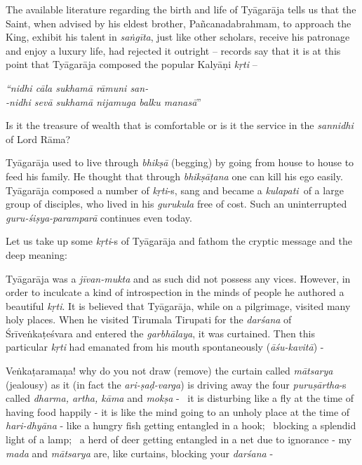 The available literature regarding the birth and life of Tyāgarāja tells us that the Saint, when advised by his eldest brother, Pañcanadabrahmam, to approach the King, exhibit his talent in \textit{saṅgīta}, just like other scholars, receive his patronage and enjoy a luxury life, had rejected it outright – records say that it is at this point that Tyāgarāja composed the popular Kalyāṇi \textit{kṛti} –

\begin{myquote}
\textit{“nidhi cāla sukhamā rāmuni san-}\\ \textit{-nidhi sevā sukhamā nijamuga balku manasā}”
\end{myquote}

Is it the treasure of wealth that is comfortable or is it the service in the \textit{sannidhi} of Lord Rāma?

Tyāgarāja used to live through \textit{bhikṣā} (begging) by going from house to house to feed his family. He thought that through \textit{bhikṣāṭana} one can kill his ego easily. Tyāgarāja composed a number of \textit{kṛti}-s, sang and became a \textit{kulapati} of a large group of disciples, who lived in his \textit{gurukula} free of cost. Such an uninterrupted \textit{guru-śiṣya-paramparā} continues even today. 

Let us take up some \textit{kṛti}-s of Tyāgarāja and fathom the cryptic message and the deep meaning: 

Tyāgarāja was a \textit{jīvan-mukta} and as such did not possess any vices. However, in order to inculcate a kind of introspection in the minds of people he authored a beautiful \textit{kṛti}. It is believed that Tyāgarāja, while on a pilgrimage, visited many holy places. When he visited Tirumala Tirupati for the \textit{darśana} of Śrīveṅkaṭeśvara and entered the \textit{garbhālaya}, it was curtained. Then this particular \textit{kṛti} had emanated from his mouth spontaneously (\textit{āśu-kavitā}) -

Veṅkaṭaramaṇa! why do you not draw (remove) the curtain called \textit{mātsarya} (jealousy) as it (in fact the \textit{ari-ṣaḍ-varga}) is driving away the four \textit{puruṣārtha}-s called \textit{dharma, artha, kāma} and \textit{mokṣa} -  it is disturbing like a fly at the time of having food happily - it is like the mind going to an unholy place at the time of \textit{hari-dhyāna} - like a hungry fish getting entangled in a hook;  blocking a splendid light of a lamp;  a herd of deer getting entangled in a net due to ignorance - my \textit{mada} and \textit{mātsarya} are, like curtains, blocking your \textit{darśana} -  

